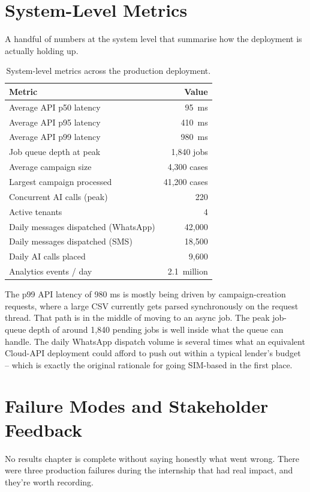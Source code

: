 \section{System-Level Metrics}
A handful of numbers at the system level that summarise how the deployment is actually holding up.

\begin{table}[H]
\centering
\caption{System-level metrics across the production deployment.}
\label{tab:sysmetrics}
\begin{tabularx}{\textwidth}{X r}
\toprule
\textbf{Metric} & \textbf{Value} \\
\midrule
Average API p50 latency & 95~ms \\
Average API p95 latency & 410~ms \\
Average API p99 latency & 980~ms \\
Job queue depth at peak & 1{,}840 jobs \\
Average campaign size & 4{,}300 cases \\
Largest campaign processed & 41{,}200 cases \\
Concurrent AI calls (peak) & 220 \\
Active tenants & 4 \\
Daily messages dispatched (WhatsApp) & 42{,}000 \\
Daily messages dispatched (SMS) & 18{,}500 \\
Daily AI calls placed & 9{,}600 \\
Analytics events / day & 2.1~million \\
\bottomrule
\end{tabularx}
\end{table}

The p99 API latency of 980 ms is mostly being driven by campaign-creation requests, where a large CSV currently gets parsed synchronously on the request thread. That path is in the middle of moving to an async job. The peak job-queue depth of around 1{,}840 pending jobs is well inside what the queue can handle. The daily WhatsApp dispatch volume is several times what an equivalent Cloud-API deployment could afford to push out within a typical lender's budget -- which is exactly the original rationale for going SIM-based in the first place.

\section{Failure Modes and Stakeholder Feedback}
No results chapter is complete without saying honestly what went wrong. There were three production failures during the internship that had real impact, and they're worth recording.

